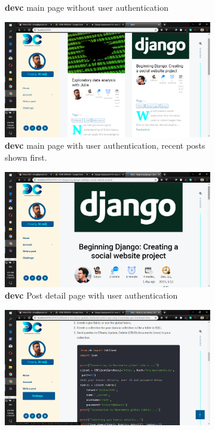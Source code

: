 \begin{itemize}
\begin{figure}[!htbp]
\begin{subfigure}[b]{0.45\textwidth}
			\caption{\textbf{devc} main page without user authentication}
		\end{subfigure}
		\hfill
		\begin{subfigure}[b]{0.45\textwidth}
			\centering
			\includegraphics[width=\linewidth]{./devcmainwith}
			\caption{\textbf{devc} main page with user authentication, recent posts shown first.}
		\end{subfigure}
	\medskip
	\begin{subfigure}[b]{0.45\textwidth}
		\centering
		\includegraphics[width=\linewidth]{./devcpostdetail}
		\caption{\textbf{devc} Post detail page with user authentication}
	\end{subfigure}
	\hfill
	\begin{subfigure}[b]{0.45\textwidth}
		\centering
		\includegraphics[width=\linewidth]{./devcpostdetailwith}

\end{subfigure}
\end{figure}
\end{itemize}
